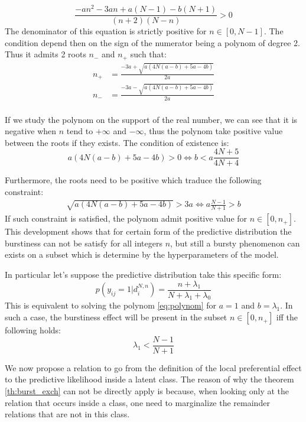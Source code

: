 \begin{equation} \label{eq:polynom}
\frac{-an^2 -3an +a(N-1)-b(N+1)}{(n+2)(N-n)} > 0 
\end{equation}
The denominator of this equation is strictly positive for $n \in [0, N-1]$. The condition depend then on the sign of the numerator being a polynom of degree 2. Thus it admits 2 roots $n_-$ and $n_+$ such that:
\begin{align}
n_+ &= \frac{-3a + \sqrt{a(4N(a-b)+5a-4b)}}{2a} \\
n_- &= \frac{-3a - \sqrt{a(4N(a-b)+5a-4b)}}{2a} \\
\end{align}

If we study the polynom on the support of the real number, we can see that it is negative when $n$ tend to $+\infty$ and $-\infty$, thus the polynom take positive value between the roots if they exists. The condition of existence is:
\begin{equation}
a(4N(a-b)+5a-4b) > 0 \iff b < a \frac{4N+5}{4N+4}
\end{equation}

Furthermore, the roots need to be positive which traduce the following constraint:
\begin{align}
\sqrt{a(4N(a-b)+5a-4b)} > 3a \iff a\frac{N-1}{N+1} > b
\end{align}
If such constraint is satisfied, the polynom admit positive value for $n \in [0, n_+]$. This development shows that for certain form of the predictive distribution the burstiness can not be satisfy for all integers $n$, but still a bursty phenomenon can exists on a subset which is determine by the hyperparameters of the model.

In particular let's suppose the predictive distribution take this specific form:
\begin{equation}
p(y_{ij}=1 | d_i^{N,n}) = \frac{n+\lambda_1}{N+\lambda_1+\lambda_0}
\end{equation}
This is equivalent to solving the polynom \eqref{eq:polynom} for $a=1$ and $b=\lambda_1$. In such a case, the burstiness effect will be present in the subset $n \in [0, n_+]$ iff the following holds:
\begin{equation}
\lambda_1 < \frac{N-1}{N+1}
\end{equation}

We now propose a relation to go from the definition of the local preferential effect to the predictive likelihood inside a latent class. The reason of why the theorem \ref{th:burst_exch} can not be directly apply is because, when looking only at the relation that occurs inside a class, one need to marginalize the remainder relations that are not in this class.

